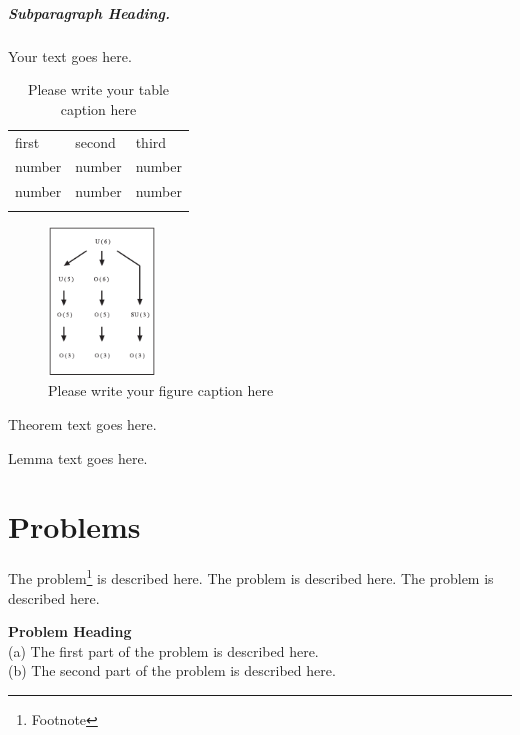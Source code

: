 \subparagraph{Subparagraph Heading.} Your text goes here.%
%
%
%
\begin{table}
	\centering
	\caption{Please write your table caption here}
	\label{tab:1}       %
	\begin{tabular}{lll}
		\hline\noalign{\smallskip}
		first & second & third  \\
		\noalign{\smallskip}\hline\noalign{\smallskip}
		number & number & number \\
		number & number & number \\
		\noalign{\smallskip}\hline
	\end{tabular}
\end{table}
%
%
%
\begin{figure}
	\centering
	\includegraphics[height=4cm]{figure}
	\caption{Please write your figure caption here}
	\label{fig:1}       %
\end{figure}
%
%
\begin{theorem}
	Theorem text goes here.
\end{theorem}
%
%
\begin{lemma}
	Lemma text goes here.
\end{lemma}
%
%
\section*{Problems}
%
\begin{prob}
	\label{prob1}
	The problem\footnote{Footnote} is described here. The
	problem is described here. The problem is described here.
\end{prob}

\begin{prob}
	\label{prob2}
	\textbf{Problem Heading}\\
	(a) The first part of the problem is described here.\\
	(b) The second part of the problem is described here.
\end{prob}



%

